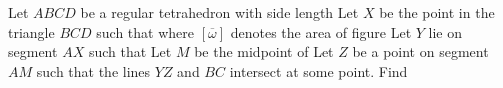 Let $ABCD$ be a regular tetrahedron with side length  Let $X$ be the point in the triangle $BCD$ such that  where $[\overline{\omega}]$ denotes the area of figure  Let $Y$ lie on segment $AX$ such that  Let $M$ be the midpoint of  Let $Z$ be a point on segment $AM$ such that the lines $YZ$ and $BC$ intersect at some point. Find 